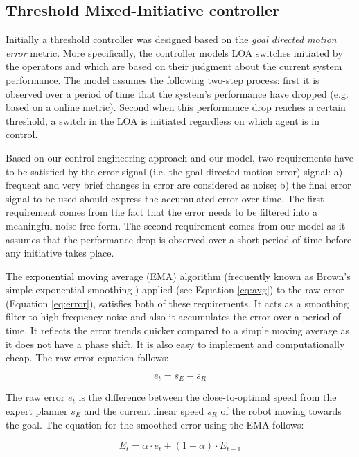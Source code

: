 \documentclass[a4paper,12pt,oneside,openright]{bhamthesis}
\begin{document}
\subsection{Threshold Mixed-Initiative controller}
\label{chapter5:threshold_controller}

Initially a threshold controller was designed based on the \textit{goal directed motion error} metric. More specifically, the controller models LOA switches initiated by the operators and which are based on their judgment about the current system performance. The model assumes the following two-step process: first it is observed over a period of time that the system's performance have dropped (e.g. based on a online metric). Second when this performance drop reaches a certain threshold, a switch in the LOA is initiated regardless on which agent is in control.

Based on our control engineering approach and our model, two requirements have to be satisfied by the error signal (i.e. the goal directed motion error) signal: a) frequent and very brief changes in error are considered as noise; b) the final error signal to be used should express the accumulated error over time. The first requirement comes from the fact that the error needs to be filtered into a meaningful noise free form. The second requirement comes from our model as it assumes that the performance drop is observed over a short period of time before any initiative takes place.

The exponential moving average (EMA) algorithm (frequently known as Brown's simple exponential smoothing \cite{Brown1963}) applied (see Equation \ref{eq:avg}) to the raw error (Equation \ref{eq:error}), satisfies both of these requirements. It acts as a smoothing filter to high frequency noise and also it accumulates the error over a period of time. It reflects the error trends quicker compared to a simple moving average as it does not have a phase shift. It is also easy to implement and computationally cheap. The raw error equation follows:

\begin{equation}\label{eq:error}
e_{t} = s_{E} - s_{R}
\end{equation}

The raw error $e_{t}$ is the difference between the close-to-optimal speed from the expert planner $s_{E}$ and the current linear speed $s_{R}$ of the robot moving towards the goal. The equation for the smoothed error using the EMA follows:

\begin{equation}\label{eq:avg}
E_{t} = \alpha \cdot e_{t} + (1-\alpha) \cdot E_{t-1}
\end{equation}
\end{document}
